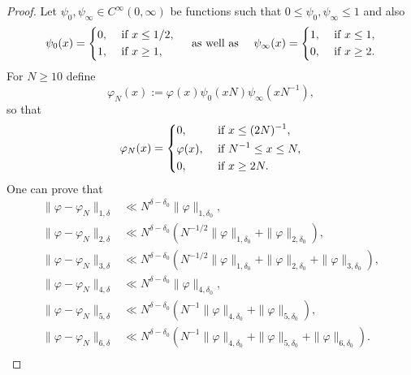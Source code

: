 \documentclass{article}
\theoremstyle{named}
\begin{document}
\begin{proof}
Let $\psi_0, \psi_\infty \in C^\infty(0, \infty)$ be functions such that $0 \leq \psi_0, \psi_\infty \leq 1$ and also
\begin{equation*}
    \psi_0(x) = \begin{dcases}
        0, & \text{ if } x \leq 1/2,\\
        1, & \text{ if } x \geq 1,
    \end{dcases}\quad \text{ as well as } \quad \psi_\infty(x) = \begin{dcases}
        1, & \text{ if }x \leq 1,\\
        0, & \text{ if }x \geq 2.
    \end{dcases}
\end{equation*}
For $N \geq 10$ define 
\begin{equation*}
    \varphi_N(x) := \varphi(x) \psi_0(xN)\psi_\infty(xN^{-1}),
\end{equation*}
so that 
\begin{equation*}
    \varphi_N(x) = \begin{dcases}
        0, & \text{ if } x \leq (2N)^{-1},\\
        \varphi(x), & \text{ if } N^{-1} \leq x \leq N,\\
        0, & \text{ if }x \geq 2N.
    \end{dcases}
\end{equation*}
One can prove that 
\begin{equation}\label{eq:approxoftestfunctioninV}
\begin{aligned}
\|\varphi - \varphi_N\|_{1, \delta} & \ll N^{\delta - \delta_0} \|\varphi\|_{1, \delta_0},\\
\|\varphi - \varphi_N\|_{2, \delta} & \ll N^{\delta - \delta_0}(N^{-1/2}\|\varphi\|_{1, \delta_0} + \|\varphi\|_{2, \delta_0}),\\
\|\varphi - \varphi_N\|_{3, \delta} & \ll N^{\delta - \delta_0}(N^{-1/2}\|\varphi\|_{1, \delta_0} + \|\varphi\|_{2, \delta_0} +  \|\varphi\|_{3, \delta_0}),\\
\|\varphi - \varphi_N\|_{4, \delta} & \ll N^{\delta - \delta_0}\|\varphi\|_{4, \delta_0},\\
\|\varphi - \varphi_N\|_{5, \delta} & \ll N^{\delta - \delta_0}(N^{-1}\|\varphi\|_{4, \delta_0} + \|\varphi\|_{5, \delta_0}),\\
\|\varphi - \varphi_N\|_{6, \delta} & \ll N^{\delta - \delta_0}(N^{-1}\|\varphi\|_{4, \delta_0} + \|\varphi\|_{5, \delta_0} +  \|\varphi\|_{6, \delta_0}).\\

\end{aligned}
\end{equation}
\end{proof}
\end{document}
